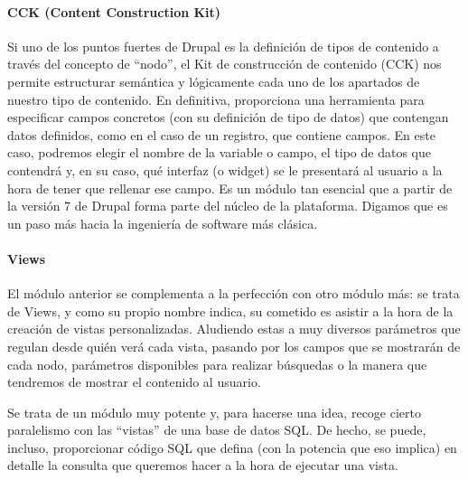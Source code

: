 \paragraph{CCK (Content Construction Kit)}
\par Si uno de los puntos fuertes de Drupal es la definición de tipos de contenido a través del concepto de ``nodo'', el Kit de construcción de contenido (CCK) nos permite estructurar semántica y lógicamente cada uno de los apartados de nuestro tipo de contenido. En definitiva, proporciona una herramienta para especificar campos concretos (con su definición de tipo de datos) que contengan datos definidos, como en el caso de un registro, que contiene campos. En este caso, podremos elegir el nombre de la variable o campo, el tipo de datos que contendrá y, en su caso, qué interfaz (o widget) se le presentará al usuario a la hora de tener que rellenar ese campo. Es un módulo tan esencial que a partir de la versión 7 de Drupal forma parte del núcleo de la plataforma. Digamos que es un paso más hacia la ingeniería de software más clásica.

\paragraph{Views}
\par El módulo anterior se complementa a la perfección con otro módulo más: se trata de Views, y como su propio nombre indica, su cometido es asistir a la hora de la creación de vistas personalizadas. Aludiendo estas a muy diversos parámetros que regulan desde quién verá cada vista, pasando por los campos que se mostrarán de cada nodo, parámetros disponibles para realizar búsquedas o la manera que tendremos de mostrar el contenido al usuario.
\par Se trata de un módulo muy potente y, para hacerse una idea, recoge cierto paralelismo con las ``vistas'' de una base de datos SQL. De hecho, se puede, incluso, proporcionar código SQL que defina (con la potencia que eso implica) en detalle la consulta que queremos hacer a la hora de ejecutar una vista.

